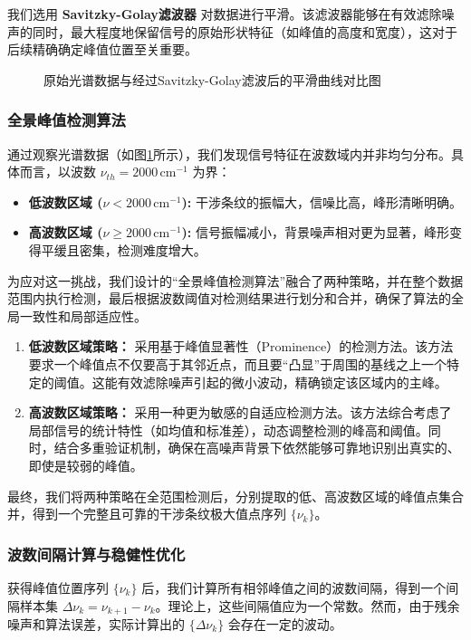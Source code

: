 \documentclass[withoutpreface,bwprint]{cumcmthesis} %
\begin{document}
我们选用 \textbf{Savitzky-Golay滤波器} 对数据进行平滑。该滤波器能够在有效滤除噪声的同时，最大程度地保留信号的原始形状特征（如峰值的高度和宽度），这对于后续精确确定峰值位置至关重要。

\begin{figure}[htbp]
    \centering
    \caption{原始光谱数据与经过Savitzky-Golay滤波后的平滑曲线对比图}
    \label{fig:smoothing}
\end{figure}

\subsubsection{全景峰值检测算法}
通过观察光谱数据（如图\ref{fig:smoothing}所示），我们发现信号特征在波数域内并非均匀分布。具体而言，以波数 $\nu_{th} = 2000 \, \text{cm}^{-1}$ 为界：
\begin{itemize}
    \item \textbf{低波数区域 ($\nu < 2000 \, \text{cm}^{-1}$):} 干涉条纹的振幅大，信噪比高，峰形清晰明确。
    \item \textbf{高波数区域 ($\nu \ge 2000 \, \text{cm}^{-1}$):} 信号振幅减小，背景噪声相对更为显著，峰形变得平缓且密集，检测难度增大。
\end{itemize}

为应对这一挑战，我们设计的“全景峰值检测算法”融合了两种策略，并在整个数据范围内执行检测，最后根据波数阈值对检测结果进行划分和合并，确保了算法的全局一致性和局部适应性。
\begin{enumerate}
    \item \textbf{低波数区域策略：} 采用基于峰值显著性（Prominence）的检测方法。该方法要求一个峰值点不仅要高于其邻近点，而且要“凸显”于周围的基线之上一个特定的阈值。这能有效滤除噪声引起的微小波动，精确锁定该区域内的主峰。
    \item \textbf{高波数区域策略：} 采用一种更为敏感的自适应检测方法。该方法综合考虑了局部信号的统计特性（如均值和标准差），动态调整检测的峰高和阈值。同时，结合多重验证机制，确保在高噪声背景下依然能够可靠地识别出真实的、即使是较弱的峰值。
\end{enumerate}
最终，我们将两种策略在全范围检测后，分别提取的低、高波数区域的峰值点集合并，得到一个完整且可靠的干涉条纹极大值点序列 $\{\nu_k\}$。

\subsubsection{波数间隔计算与稳健性优化}
获得峰值位置序列 $\{\nu_k\}$ 后，我们计算所有相邻峰值之间的波数间隔，得到一个间隔样本集 $\Delta\nu_k = \nu_{k+1} - \nu_k$。理论上，这些间隔值应为一个常数。然而，由于残余噪声和算法误差，实际计算出的 $\{\Delta\nu_k\}$ 会存在一定的波动。
\end{document}
